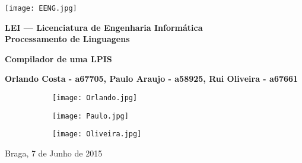 \begin{titlepage}
\begin{center}

\begin{flushleft}
\texttt{[image: EENG.jpg]}\\
\end{flushleft}

\vspace{1.5cm}

\Large{\textbf{LEI --- Licenciatura de Engenharia Informática}}\\
\vspace{1cm}
\Large{\textbf{Processamento de Linguagens}}\\

\vspace{1cm}

\Huge{\textbf{Compilador de uma LPIS}} \\

\vspace{2cm}

\Large{\textbf{Orlando Costa -  a67705, Paulo Araujo - a58925, Rui Oliveira - a67661}}\\
\begin{figure}[h]
\centering
\begin{subfigure}{.3\textwidth}
  \centering
  \texttt{[image: Orlando.jpg]}
\end{subfigure}
\begin{subfigure}{.3\textwidth}
  \centering
  \texttt{[image: Paulo.jpg]}
\end{subfigure}
\begin{subfigure}{.3\textwidth}
  \centering
  \texttt{[image: Oliveira.jpg]}
\end{subfigure}
\end{figure}

\vspace{1.5cm}
Braga, 7 de Junho de 2015

\end{center}

\end{titlepage}
